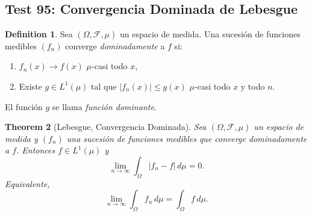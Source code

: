 \documentclass[11pt,a4paper]{article}
\theoremstyle{plain}
\newtheorem{theorem}{Theorem}[section]
\theoremstyle{definition}
\newtheorem{definition}[theorem]{Definition}
\begin{document}
\subsection*{Test 95: Convergencia Dominada de Lebesgue}

\begin{definition}
Sea $(\Omega,\mathcal{F},\mu)$ un espacio de medida. Una sucesión de funciones medibles $(f_{n})$ converge \emph{dominadamente} a $f$ si:
\begin{enumerate}
\item $f_{n}(x)\to f(x)$ $\mu$-casi todo $x$,
\item Existe $g\in L^{1}(\mu)$ tal que $|f_{n}(x)|\le g(x)$ $\mu$-casi todo $x$ y todo $n$.
\end{enumerate}
El función $g$ se llama \emph{función dominante}.
\end{definition}

\begin{theorem}[Lebesgue, Convergencia Dominada]
Sea $(\Omega,\mathcal{F},\mu)$ un espacio de medida y $(f_{n})$ una sucesión de funciones medibles que converge dominadamente a $f$. Entonces $f\in L^{1}(\mu)$ y
\[
\lim_{n\to\infty}\int_{\Omega}|f_{n}-f|\,d\mu=0.
\]
Equivalente,
\[
\lim_{n\to\infty}\int_{\Omega}f_{n}\,d\mu=\int_{\Omega}f\,d\mu.
\]
\end{theorem}
\end{document}

